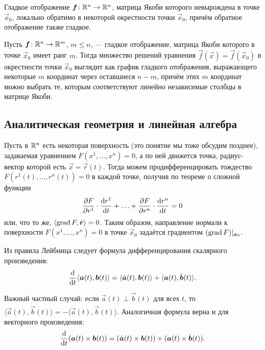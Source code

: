 \begin{theorem}
	Гладкое отображение $\boldsymbol{f}\colon \mathbb{R}^n \to \mathbb{R}^n$, матрица Якоби которого невырождена в точке $\vec{x}_0$, локально обратимо в некоторой окрестности точки $\vec{x}_0$, причём обратное отображение также гладкое.
\end{theorem}

\begin{theorem}
	Пусть $\boldsymbol{f}\colon \mathbb{R}^n \to \mathbb{R}^m$, $m \leqslant n$, --- гладкое отображение, матрица Якоби которого в точке $\vec{x}_0$ имеет ранг $m$. Тогда множество решений уравнения $\vec{f}(\vec{x}) = \vec{f}(\vec{x}_0)$ в окрестности точки $\vec{x}_0$ выглядит как график гладкого отображения, выражающего некоторые $m$ координат через оставшиеся $n - m$, причём этих $m$ координат можно выбрать те, которым соответствуют линейно независимые столбцы в матрице Якоби.
\end{theorem}

\subsection{Аналитическая геометрия и линейная алгебра}

Пусть в $\mathbb{R}^n$ есть некоторая поверхность (это понятие мы тоже обсудим позднее), задаваемая уравнением $F(x^1, \ldots, x^n) = 0$, а по ней движется точка, радиус-вектор которой есть $\vec{x} = \vec{r}(t)$. Тогда можем продифференцировать тождество $F(r^1(t), \ldots, r^n(t)) = 0$ в каждой точке, получив по теореме о сложной функции
\[
	\frac{\partial F}{\partial r^1} \cdot \frac{\mathop{}\!\mathrm{d} r^1}{\mathop{}\!\mathrm{d} t} + \ldots + \frac{\partial F}{\partial r^n} \cdot \frac{\mathop{}\!\mathrm{d} r^n}{\mathop{}\!\mathrm{d} t} = 0
\]
или, что то же, $\langle \operatorname{grad} F, \dot{\boldsymbol{r}} \rangle = 0$. Таким образом, направление нормали к поверхности $F(x^1, \ldots, x^n) = 0$ в точке $\vec{x}_0$ задаётся градиентом $(\operatorname{grad} F)|_{\boldsymbol{x}_0}$.

Из правила Лейбница следует формула дифференцирования скалярного произведения:
\[
	\frac{\mathop{}\!\mathrm{d}}{\mathop{}\!\mathrm{d} t}\langle \boldsymbol{a}(t), \boldsymbol{b}(t) \rangle = \langle \dot{\boldsymbol{a}}(t), \boldsymbol{b}(t) \rangle + \langle \boldsymbol{a}(t), \dot{\boldsymbol{b}}(t) \rangle.
\]

Важный частный случай: если $\vec{a}(t) \perp \vec{b}(t)$ для всех $t$, то $\langle\vec{a}(t), \dot{\vec{b}}(t)\rangle = -\langle\dot{\vec{a}}(t), \vec{b}(t)\rangle$. Аналогичная формула верна и для векторного произведения:
\[
	\frac{\mathop{}\!\mathrm{d}}{\mathop{}\!\mathrm{d} t}(\boldsymbol{a}(t) \times \boldsymbol{b}(t)) = (\dot{\boldsymbol{a}}(t) \times \boldsymbol{b}(t)) + (\boldsymbol{a}(t) \times \dot{\boldsymbol{b}}(t)).
\]

